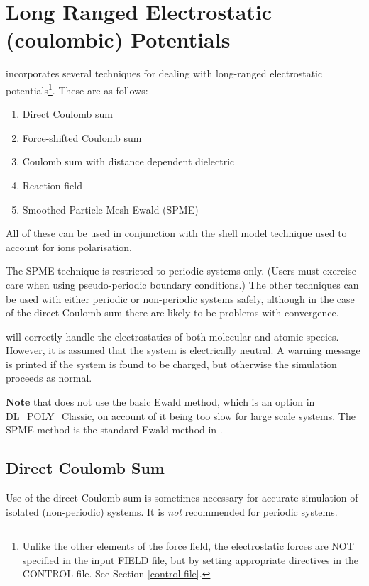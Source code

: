 \section{Long Ranged Electrostatic (coulombic) Potentials}
\label{coulomb}

\D incorporates several techniques for dealing with long-ranged
electrostatic potentials\footnote{Unlike the
other elements of the force field, the electrostatic forces are
NOT specified in the input FIELD file, but by setting appropriate
directives in the CONTROL file. See Section \ref{control-file}.}.
These are as follows:
\begin{enumerate}
\item Direct Coulomb sum
\item Force-shifted Coulomb sum
\item Coulomb sum with distance dependent dielectric
\item Reaction field
\item Smoothed Particle Mesh Ewald (SPME)
\end{enumerate}
All of these can be used in conjunction with the shell
model technique used to
account for ions polarisation.

The SPME technique is restricted to periodic systems only. (Users
must exercise care when using pseudo-periodic boundary
conditions.)  The other techniques can
be used with either periodic or non-periodic systems safely,
although in the case of the direct Coulomb sum there are likely to be problems with convergence.

\D will correctly handle the electrostatics of both molecular and
atomic species.  However, it is assumed that the system is
electrically neutral.  A warning message is printed if the system
is found to be charged, but otherwise the simulation proceeds as
normal.

{\bf Note} that \D does not use the basic Ewald method, which is an
option in DL\_POLY\_Classic, on account of it being too slow for large
scale systems.  The SPME method is the standard Ewald method in \D.

\subsection{Direct Coulomb Sum}

Use of the direct Coulomb sum is
sometimes necessary for accurate simulation of isolated
(non-periodic) systems.  It is {\em not} recommended for periodic
systems.


